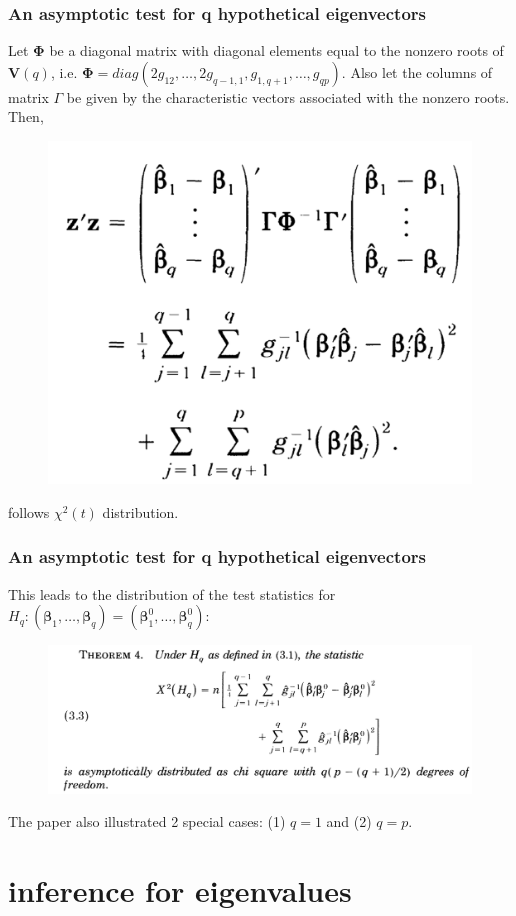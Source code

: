 \documentclass{beamer}
\begin{document}
\begin{frame}
	\frametitle{An asymptotic test for q hypothetical eigenvectors}
	Let $\bm{\Phi} $ be a diagonal matrix with diagonal elements equal to the nonzero roots of $\bm{V}(q)$, i.e. $\bm{\Phi} = diag(2g_{12},\ldots,2g_{q-1,1},g_{1,q+1},\ldots,g_{qp})$. Also let the columns of matrix $\Gamma$ be given by the characteristic vectors associated with the nonzero roots. Then, 
	\begin{figure}
		\includegraphics[width=0.5\linewidth]{image011.png}
	\end{figure}
	follows $\chi^2(t)$ distribution.
\end{frame}

\begin{frame}
	\frametitle{An asymptotic test for q hypothetical eigenvectors}
	This leads to the distribution of the test statistics for  $H_q: (\bm{\beta}_1,\ldots,\bm{\beta}_q) = (\bm{\beta}_1^0,\ldots,\bm{\beta}_q^0)$:
	\begin{figure}
		\includegraphics[width=.9\linewidth]{image012.png}
	\end{figure}
The paper also illustrated 2 special cases: (1) $q=1$ and (2) $q = p$.
\end{frame}

\section{inference for eigenvalues}
\end{document}
